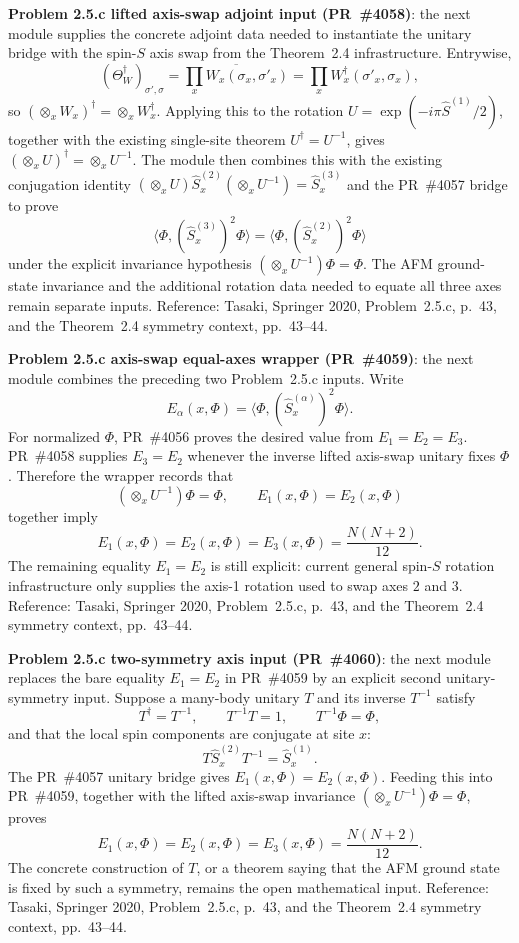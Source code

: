 \documentclass[a4paper,11pt]{article}
\begin{document}
\textbf{Problem 2.5.c lifted axis-swap adjoint input (PR~\#4058)}:
the next module supplies the concrete adjoint data needed to instantiate the
unitary bridge with the spin-\(S\) axis swap from the Theorem~2.4
infrastructure.  Entrywise,
\[
  (\Theta_W^\dagger)_{\sigma',\sigma}
  =
  \overline{\prod_x W_x(\sigma_x,\sigma'_x)}
  =
  \prod_x W_x^\dagger(\sigma'_x,\sigma_x),
\]
so \((\otimes_x W_x)^\dagger=\otimes_x W_x^\dagger\).  Applying this to
the rotation \(U=\exp(-i\pi\hat S^{(1)}/2)\), together with the existing
single-site theorem \(U^\dagger=U^{-1}\), gives
\((\otimes_x U)^\dagger=\otimes_x U^{-1}\).  The module then combines this
with the existing conjugation identity
\((\otimes_x U)\hat S_x^{(2)}(\otimes_x U^{-1})=\hat S_x^{(3)}\) and the
PR~\#4057 bridge to prove
\[
  \langle\Phi,(\hat S_x^{(3)})^2\Phi\rangle
  =
  \langle\Phi,(\hat S_x^{(2)})^2\Phi\rangle
\]
under the explicit invariance hypothesis \((\otimes_x U^{-1})\Phi=\Phi\).
The AFM ground-state invariance and the additional rotation data needed to
equate all three axes remain separate inputs.  Reference: Tasaki, Springer
2020, Problem~2.5.c, p.~43, and the Theorem~2.4 symmetry context,
pp.~43--44.

\textbf{Problem 2.5.c axis-swap equal-axes wrapper (PR~\#4059)}:
the next module combines the preceding two Problem~2.5.c inputs.  Write
\[
  E_\alpha(x,\Phi)=
  \langle\Phi,(\hat S_x^{(\alpha)})^2\Phi\rangle .
\]
For normalized \(\Phi\), PR~\#4056 proves the desired value from
\(E_1=E_2=E_3\).  PR~\#4058 supplies \(E_3=E_2\) whenever the inverse
lifted axis-swap unitary fixes \(\Phi\).  Therefore the wrapper records that
\[
  (\otimes_x U^{-1})\Phi=\Phi,\qquad E_1(x,\Phi)=E_2(x,\Phi)
\]
together imply
\[
  E_1(x,\Phi)=E_2(x,\Phi)=E_3(x,\Phi)=\frac{N(N+2)}{12}.
\]
The remaining equality \(E_1=E_2\) is still explicit: current general
spin-\(S\) rotation infrastructure only supplies the axis-1 rotation used to
swap axes \(2\) and \(3\).  Reference: Tasaki, Springer 2020,
Problem~2.5.c, p.~43, and the Theorem~2.4 symmetry context, pp.~43--44.

\textbf{Problem 2.5.c two-symmetry axis input (PR~\#4060)}:
the next module replaces the bare equality \(E_1=E_2\) in PR~\#4059 by an
explicit second unitary-symmetry input.  Suppose a many-body unitary \(T\) and
its inverse \(T^{-1}\) satisfy
\[
  T^\dagger=T^{-1},\qquad T^{-1}T=1,\qquad T^{-1}\Phi=\Phi,
\]
and that the local spin components are conjugate at site \(x\):
\[
  T\hat S_x^{(2)}T^{-1}=\hat S_x^{(1)}.
\]
The PR~\#4057 unitary bridge gives \(E_1(x,\Phi)=E_2(x,\Phi)\).  Feeding this
into PR~\#4059, together with the lifted axis-swap invariance
\((\otimes_x U^{-1})\Phi=\Phi\), proves
\[
  E_1(x,\Phi)=E_2(x,\Phi)=E_3(x,\Phi)=\frac{N(N+2)}{12}.
\]
The concrete construction of \(T\), or a theorem saying that the AFM ground
state is fixed by such a symmetry, remains the open mathematical input.
Reference: Tasaki, Springer 2020, Problem~2.5.c, p.~43, and the
Theorem~2.4 symmetry context, pp.~43--44.
\end{document}
